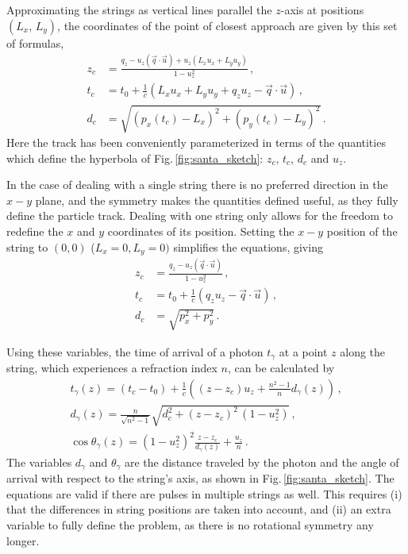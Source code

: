 \documentclass[../Main.tex]{subfiles}
\begin{document}
Approximating the strings as vertical lines parallel the $z$-axis at positions $(L_x,\,L_y)$, the coordinates of the point of closest approach are given by this set of formulas,
\begin{align}
z_c &= \frac{q_z - u_z \left( \vec{q}\cdot\vec{u}\right) + u_z \left( L_x u_x + L_y u_y\right)}{1-u^2_z}\,,\\
t_c &= t_0 + \frac{1}{c} \left( L_x u_x + L_y u_y + q_z u_z - \vec{q}\cdot\vec{u} \right)\,, \\
d_c &= \sqrt{\left( p_{x}(t_c) - L_x  \right)^2 + \left( p_{y}(t_c) - L_y \right)^2}\,.
\label{eq:hyperbola_third_eq}
\end{align}
Here the track has been conveniently parameterized in terms of the quantities which define the hyperbola of Fig.\,\ref{fig:santa_sketch}: $z_c$, $t_c$, $d_c$ and $u_z$.

In the case of dealing with a single string there is no preferred direction in the $x-y$ plane, and the symmetry makes the quantities defined useful, as they fully define the particle track. Dealing with one string only allows for the freedom to redefine the $x$ and $y$ coordinates of its position. Setting the $x-y$ position of the string to $(0,0)$ ($L_x = 0, L_y = 0)$ simplifies the equations, giving
\begin{align}
z_c &= \frac{q_z - u_z \left( \vec{q}\cdot\vec{u}\right)}{1-u^2_z}\,,\\
t_c &= t_0 + \frac{1}{c} \left( q_z u_z - \vec{q}\cdot\vec{u} \right)\,, \\
d_c &= \sqrt{ p^2_x + p^2_y }\,.
\end{align}

Using these variables, the time of arrival of a photon $t_\gamma$ at a point $z$ along the string, which experiences a refraction index $n$, can be calculated by
\begin{align}
t_\gamma(z) = \left(t_c - t_0 \right) + \frac{1}{c} \left( \left(z-z_c\right) u_z + \frac{n^2 -1}{n} d_\gamma(z) \right)\,, \\
d_\gamma(z) = \frac{n}{\sqrt{n^2-1}} \sqrt{d^2_c + (z-z_c)^2\,(1-u_z^2)}\,,\\
\cos \theta_\gamma(z) = \left( 1-u_z^2\right)^2 \frac{z-z_c}{d_\gamma(z)} + \frac{u_z}{n}\,.
\end{align}
The variables $d_\gamma$ and $\theta_\gamma$ are the distance traveled by the photon and the angle of arrival with respect to the string's axis, as shown in Fig.\,\ref{fig:santa_sketch}. The equations are valid if there are pulses in multiple strings as well. This requires (i) that the differences in string positions are taken into account, and (ii) an extra variable to fully define the problem, as there is no rotational symmetry any longer.
\end{document}
